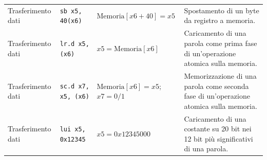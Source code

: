 \documentclass[12pt, a4paper]{article}
\begin{document}
\begin{table}[H]
{\begin{tabular}{l l l p{6cm}}
Trasferimento dati & \texttt{sb x5, 40(x6)} & $\text{Memoria}[x6+40] = x5$ & Spostamento di un byte da registro a memoria. \\
\addlinespace
Trasferimento dati & \texttt{lr.d x5, (x6)} & $x5 = \text{Memoria}[x6]$ & Caricamento di una parola come prima fase di un'operazione atomica sulla memoria. \\
Trasferimento dati & \texttt{sc.d x7, x5, (x6)} & $\text{Memoria}[x6] = x5$; $x7=0/1$ & Memorizzazione di una parola come seconda fase di un'operazione atomica sulla memoria. \\
Trasferimento dati & \texttt{lui x5, 0x12345} & $x5 = 0x12345000$ & Caricamento di una costante su 20 bit nei 12 bit più significativi di una parola. \\
\bottomrule
\end{tabular}%
}
\end{table}
\end{document}
